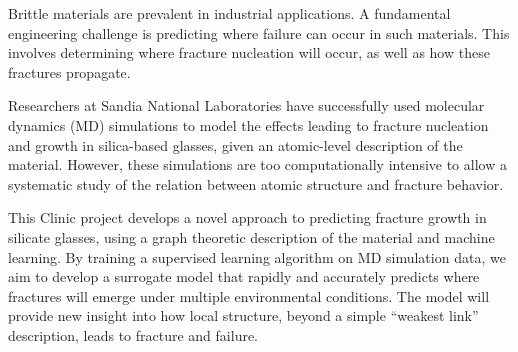 Brittle materials are prevalent in industrial applications. A fundamental engineering challenge is predicting where failure can occur in such materials. This involves determining where fracture nucleation will occur, as well as how these fractures propagate.

Researchers at Sandia National Laboratories have successfully used molecular dynamics (MD) simulations to model the effects leading to fracture nucleation and growth in silica-based glasses, given an atomic-level description of the material. However, these simulations are too computationally intensive to allow a systematic study of the relation between atomic structure and fracture behavior.

This Clinic project develops a novel approach to predicting fracture growth in silicate glasses, using a graph theoretic description of the material and machine learning. By training a supervised learning algorithm on MD simulation data, we aim to develop a surrogate model that rapidly and accurately predicts where fractures will emerge under multiple environmental conditions. The model will provide new insight into how local structure, beyond a simple ``weakest link'' description, leads to fracture and failure.

%
%


 
 
 
